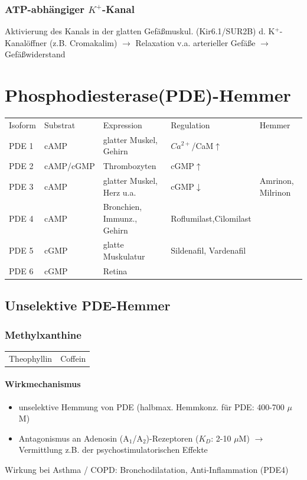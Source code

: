 \documentclass[10pt,a4paper]{report}
\begin{document}
\subsubsection{ATP-abhängiger $K^+$-Kanal}

Aktivierung des Kanals in der glatten Gefäßmuskul. (Kir6.1/SUR2B) d. K$^+$-Kanalöffner (z.B. Cromakalim) $\rightarrow$ Relaxation v.a. arterieller Gefäße $\rightarrow$ Gefäßwiderstand 

\section{Phosphodiesterase(PDE)-Hemmer}

\begin{tabularx}{\textwidth}{XXXXX}
Isoform&Substrat&Expression&Regulation&Hemmer\\
PDE 1&cAMP&glatter Muskel, Gehirn&$Ca^{2+}$/CaM$\uparrow$\\  
PDE 2&cAMP/cGMP&Thrombozyten&cGMP$\uparrow$\\
PDE 3&cAMP&glatter Muskel, Herz u.a.&cGMP$\downarrow$&Amrinon, Milrinon\\
PDE 4&cAMP&Bronchien, Immunz., Gehirn&Roflumilast,Cilomilast\\
PDE 5&cGMP&glatte Muskulatur&Sildenafil, Vardenafil\\
PDE 6&cGMP&Retina&&\\
\end{tabularx}

\subsection{Unselektive PDE-Hemmer}
\subsubsection{Methylxanthine}

\begin{tabularx}{\textwidth}{XX}
Theophyllin&Coffein\\
\end{tabularx}

\paragraph{Wirkmechanismus}
\begin{itemize}
	\item unselektive Hemmung von PDE (halbmax. Hemmkonz. für PDE: 400-700 $\mu$ M) 
	\item Antagonismus an Adenosin (A$_1$/A$_2$)-Rezeptoren ($K_D$: 2-10 $\mu$M)
	$\rightarrow$ Vermittlung z.B. der psychostimulatorischen Effekte
\end{itemize}
Wirkung bei Asthma / COPD: Bronchodilatation, Anti-Inflammation (PDE4)
\end{document}
